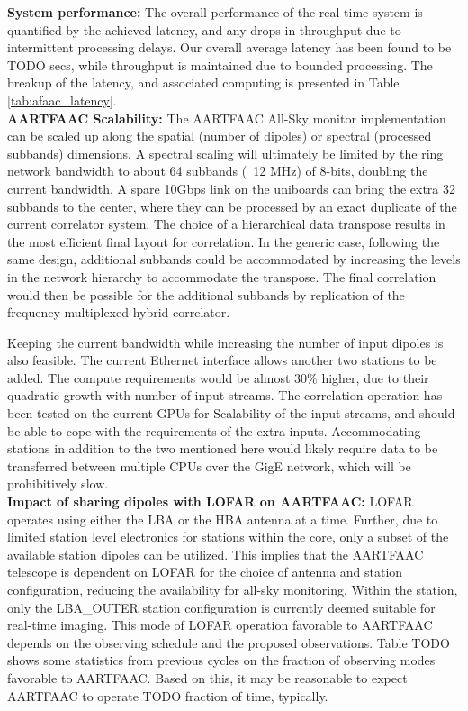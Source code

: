 \documentclass{ws-jai}
\begin{document}
\noindent \textbf {System performance:} The overall performance of the real-time
system is quantified by the achieved latency, and any drops in throughput due to
intermittent processing delays. Our overall average latency has been found to be
TODO secs, while throughput is maintained due to bounded processing. The breakup
of   the   latency,   and   associated   computing   is   presented   in   Table
\ref{tab:afaac_latency}.\\

\noindent  \textbf   {AARTFAAC  Scalability:}   The  AARTFAAC   All-Sky  monitor
implementation  can be  scaled  up  along the  spatial  (number  of dipoles)  or
spectral (processed subbands) dimensions. A  spectral scaling will ultimately be
limited by the ring network bandwidth to  about 64 subbands (~12 MHz) of 8-bits,
doubling the current  bandwidth. A spare 10Gbps link on  the uniboards can bring
the extra  32 subbands to the  center, where they  can be processed by  an exact
duplicate of the  current correlator system.  The choice of  a hierarchical data
transpose results  in the most efficient  final layout for correlation.   In the
generic  case,  following   the  same  design,  additional   subbands  could  be
accommodated by  increasing the levels  in the network hierarchy  to accommodate
the transpose.  The final correlation would  then be possible for the additional
subbands by replication of the frequency multiplexed hybrid correlator.

Keeping the  current bandwidth while increasing  the number of input  dipoles is
also feasible. The current Ethernet interface  allows another two stations to be
added.   The compute  requirements would  be almost  30\% higher,  due to  their
quadratic growth  with number of  input streams.  The correlation  operation has
been tested on the current GPUs for Scalability of the input streams, and should
be  able to  cope  with the  requirements of  the  extra inputs.   Accommodating
stations in addition to  the two mentioned here would likely  require data to be
transferred  between  multiple  CPUs  over  the  GigE  network,  which  will  be
prohibitively slow.\\

\noindent  \textbf {Impact  of sharing  dipoles with  LOFAR on  AARTFAAC:} LOFAR
operates using  either the LBA  or the  HBA antenna at  a time. Further,  due to
limited station level electronics for stations within the core, only a subset of
the available  station dipoles can be  utilized. This implies that  the AARTFAAC
telescope  is  dependent  on  LOFAR  for  the  choice  of  antenna  and  station
configuration,  reducing the  availability  for all-sky  monitoring. Within  the
station, only the LBA\_OUTER station  configuration is currently deemed suitable
for  real-time imaging.   This mode  of  LOFAR operation  favorable to  AARTFAAC
depends on  the observing  schedule and the  proposed observations.   Table TODO
shows some  statistics from previous cycles  on the fraction of  observing modes
favorable to AARTFAAC. Based on this, it may be reasonable to expect AARTFAAC to
operate TODO fraction of time, typically.\\
\end{document}
